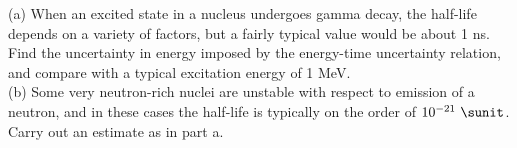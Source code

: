 (a) When an excited state in a nucleus undergoes gamma decay, the half-life depends
on a variety of factors, but a fairly typical value would be about 1 ns.
Find the uncertainty in energy imposed by the energy-time uncertainty relation,
and compare with a typical excitation energy of 1 MeV.\\
(b) Some very neutron-rich nuclei are unstable with respect to emission of
a neutron, and in these cases the half-life is typically on the order of
$10^{-21}\ \sunit$. Carry out an estimate as in part a.
